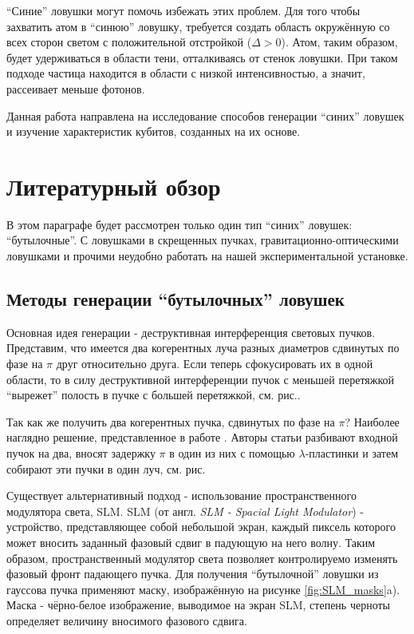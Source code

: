 \documentclass[12pt]{article}
\begin{document}
    \enquote{Синие} ловушки могут помочь избежать этих проблем. Для того чтобы
    захватить атом в \enquote{синюю} ловушку, требуется создать область окружённую
    со всех сторон светом с положительной отстройкой ($\Delta > 0$). Атом, таким
    образом, будет удерживаться в области тени, отталкиваясь от стенок ловушки.
    При таком подходе частица находится в области с низкой интенсивностью, а значит,
    рассеивает меньше фотонов.
    

    Данная работа направлена на исследование способов генерации \enquote{синих}
    ловушек и изучение характеристик кубитов, созданных на их основе.


    \section{Литературный обзор}
        В этом параграфе будет рассмотрен только один тип \enquote{синих} ловушек:
        \enquote{бутылочные}. С ловушками в скрещенных пучках, гравитационно-оптическими
        ловушками и прочими неудобно работать на нашей экспериментальной установке.

        \subsection{Методы генерации \enquote{бутылочных} ловушек}
        Основная идея генерации - деструктивная интерференция световых пучков. Представим,
        что имеется два когерентных луча разных диаметров сдвинутых по фазе на $\pi$
        друг относительно друга. Если теперь сфокусировать их в одной области, то в силу
        деструктивной интерференции пучок с меньшей перетяжкой \enquote{вырежет} полость в
        пучке с большей перетяжкой, см. рис..

        

        Так как же получить два когерентных пучка, сдвинутых по фазе на $\pi$? Наиболее
        наглядно решение, представленное в работе \cite{isenhower2009atom}. Авторы статьи разбивают
        входной пучок на два, вносят задержку $\pi$ в один из них с помощью
        $\lambda$-пластинки и затем собирают эти пучки в один луч, см. рис.



        Существует альтернативный подход - использование пространственного модулятора света, SLM.
        SLM (от англ. \textit{SLM - Spacial Light Modulator}) - устройство, представляющее собой
        небольшой экран, каждый пиксель которого может вносить заданный фазовый сдвиг в падующую
        на него волну. Таким образом, пространственный модулятор света позволяет контролируемо
        изменять фазовый фронт падающего пучка. Для получения \enquote{бутылочной} ловушки из гауссова
        пучка применяют маску, изображённую на рисунке \ref{fig:SLM_masks}a). Маска - чёрно-белое изображение, выводимое
        на экран SLM, степень черноты определяет величину вносимого фазового сдвига.
\end{document}
